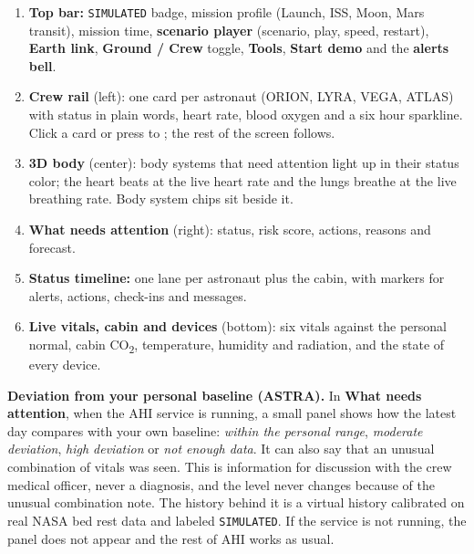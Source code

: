 \begin{enumerate}
\item[\callout{1}] \textbf{Top bar:} \texttt{SIMULATED} badge, mission profile (Launch, ISS, Moon, Mars transit), mission time, \textbf{scenario player} (scenario, play, speed, restart), \textbf{Earth link}, \textbf{Ground / Crew} toggle, \textbf{Tools}, \textbf{Start demo} and the \textbf{alerts bell}.
\item[\callout{2}] \textbf{Crew rail} (left): one card per astronaut (ORION, LYRA, VEGA, ATLAS) with status in plain words, heart rate, blood oxygen and a six hour sparkline. Click a card or press  to ; the rest of the screen follows.
\item[\callout{3}] \textbf{3D body} (center): body systems that need attention light up in their status color; the heart beats at the live heart rate and the lungs breathe at the live breathing rate. Body system chips sit beside it.
\item[\callout{4}] \textbf{What needs attention} (right): status, risk score, actions, reasons and forecast.
\item[\callout{5}] \textbf{Status timeline:} one lane per astronaut plus the cabin, with markers for alerts, actions, check-ins and messages.
\item[\callout{6}] \textbf{Live vitals, cabin and devices} (bottom): six vitals against the personal normal, cabin CO\textsubscript{2}, temperature, humidity and radiation, and the state of every device.
\end{enumerate}

\medskip\noindent\textbf{Deviation from your personal baseline (ASTRA).} In \textbf{What needs attention}, when the AHI service is running, a small panel shows how the latest day compares with your own baseline: \emph{within the personal range}, \emph{moderate deviation}, \emph{high deviation} or \emph{not enough data}. It can also say that an unusual combination of vitals was seen. This is information for discussion with the crew medical officer, never a diagnosis, and the level never changes because of the unusual combination note. The history behind it is a virtual history calibrated on real NASA bed rest data and labeled \texttt{SIMULATED}. If the service is not running, the panel does not appear and the rest of AHI works as usual.
